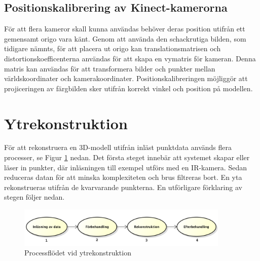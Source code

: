 \documentclass[a4paper,12pt,oneside,final]{extbook}
\begin{document}
\subsection{Positionskalibrering av Kinect-kamerorna}
För att flera kameror skall kunna användas behöver deras position utifrån ett gemensamt origo vara känt. Genom att använda den schackrutiga bilden, som tidigare nämnts, för att placera ut origo kan translationsmatrisen och distortionskoefficenterna användas för att skapa en vymatris för kameran. Denna matris kan användas för att transformera bilder och punkter mellan världskoordinater och kamerakoordinater. Positionskalibreringen möjliggör att projiceringen av färgbilden sker utifrån korrekt vinkel och position på modellen\cite{kinectextrinc}.

\section{Ytrekonstruktion}
För att rekonstruera en 3D-modell utifrån inläst punktdata används flera processer, se Figur \ref{fig:pclflow} nedan. Det första steget innebär att systemet skapar eller läser in punkter, där inläsningen  till exempel utförs med en IR-kamera. Sedan reduceras datan för att minska komplexiteten och brus filtreras bort. En yta rekonstrueras utifrån de kvarvarande punkterna. En utförligare förklaring av stegen följer nedan.

\begin{figure}[h!]
  \centering
  \includegraphics[width=0.9\textwidth]{bilder/rek2siffror.png}
  \caption{Processflödet vid ytrekonstruktion}
  \label{fig:pclflow}
\end{figure}
\end{document}
